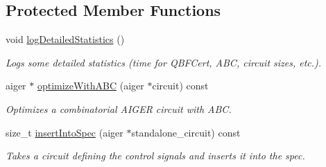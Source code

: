 \subsection*{Protected Member Functions}
\begin{DoxyCompactItemize}
\item 
void \hyperlink{classQBFCertImplExtractor_aa6a292ba4108e707f458c04d621a6d9e}{log\-Detailed\-Statistics} ()
\begin{DoxyCompactList}\small\item\em Logs some detailed statistics (time for Q\-B\-F\-Cert, A\-B\-C, circuit sizes, etc.). \end{DoxyCompactList}\item 
aiger $\ast$ \hyperlink{classCNFImplExtractor_a58a4e5021d0ef9c4190a5be74fb5a83e}{optimize\-With\-A\-B\-C} (aiger $\ast$circuit) const 
\begin{DoxyCompactList}\small\item\em Optimizes a combinatorial A\-I\-G\-E\-R circuit with A\-B\-C. \end{DoxyCompactList}\item 
size\-\_\-t \hyperlink{classCNFImplExtractor_a0970602635f3356712d57ebb28d12c0d}{insert\-Into\-Spec} (aiger $\ast$standalone\-\_\-circuit) const 
\begin{DoxyCompactList}\small\item\em Takes a circuit defining the control signals and inserts it into the spec. \end{DoxyCompactList}\end{DoxyCompactItemize}
